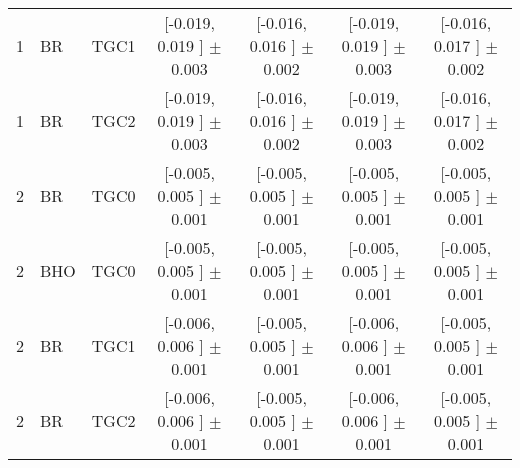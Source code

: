 \begin{landscape}
\begin{table}[htbp]
\begin{tabular}{lllcccc}
 1 & BR  & TGC1 &  [-0.019, 0.019 ] $\pm$ 0.003 &  [-0.016, 0.016 ] $\pm$ 0.002 &  [-0.019, 0.019 ] $\pm$ 0.003 &  [-0.016, 0.017 ] $\pm$ 0.002 \\
 1 & BR  & TGC2 &  [-0.019, 0.019 ] $\pm$ 0.003 &  [-0.016, 0.016 ] $\pm$ 0.002 &  [-0.019, 0.019 ] $\pm$ 0.003 &  [-0.016, 0.017 ] $\pm$ 0.002 \\
 2 & BR  & TGC0 &  [-0.005, 0.005 ] $\pm$ 0.001 &  [-0.005, 0.005 ] $\pm$ 0.001 &  [-0.005, 0.005 ] $\pm$ 0.001 &  [-0.005, 0.005 ] $\pm$ 0.001 \\
 2 & BHO & TGC0 &  [-0.005, 0.005 ] $\pm$ 0.001 &  [-0.005, 0.005 ] $\pm$ 0.001 &  [-0.005, 0.005 ] $\pm$ 0.001 &  [-0.005, 0.005 ] $\pm$ 0.001 \\
 2 & BR  & TGC1 &  [-0.006, 0.006 ] $\pm$ 0.001 &  [-0.005, 0.005 ] $\pm$ 0.001 &  [-0.006, 0.006 ] $\pm$ 0.001 &  [-0.005, 0.005 ] $\pm$ 0.001 \\
 2 & BR  & TGC2 &  [-0.006, 0.006 ] $\pm$ 0.001 &  [-0.005, 0.005 ] $\pm$ 0.001 &  [-0.006, 0.006 ] $\pm$ 0.001 &  [-0.005, 0.005 ] $\pm$ 0.001 \\
\hline\hline
\end{tabular}
\end{table}
 \end{landscape}

